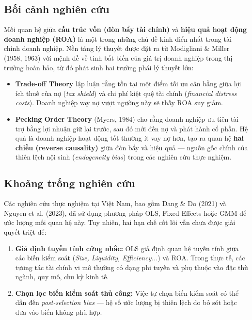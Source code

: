 \documentclass[12pt,a4paper]{article}
\begin{document}
\subsection{Bối cảnh nghiên cứu}
Mối quan hệ giữa \textbf{cấu trúc vốn (đòn bẩy tài chính)} và \textbf{hiệu quả hoạt động doanh nghiệp (ROA)} là một trong những chủ đề kinh điển nhất trong tài chính doanh nghiệp. Nền tảng lý thuyết được đặt ra từ Modigliani \& Miller (1958, 1963) với mệnh đề về tính bất biến của giá trị doanh nghiệp trong thị trường hoàn hảo, từ đó phát sinh hai trường phái lý thuyết lớn:
\begin{itemize}
    \item \textbf{Trade-off Theory} lập luận rằng tồn tại một điểm tối ưu cân bằng giữa lợi ích thuế của nợ (\textit{tax shield}) và chi phí kiệt quệ tài chính (\textit{financial distress costs}). Doanh nghiệp vay nợ vượt ngưỡng này sẽ thấy ROA suy giảm.
    \item \textbf{Pecking Order Theory} (Myers, 1984) cho rằng doanh nghiệp ưu tiên tài trợ bằng lợi nhuận giữ lại trước, sau đó mới đến nợ và phát hành cổ phần. Hệ quả là doanh nghiệp hoạt động tốt thường ít vay nợ hơn, tạo ra quan hệ \textbf{hai chiều (reverse causality)} giữa đòn bẩy và hiệu quả --- nguồn gốc chính của thiên lệch nội sinh (\textit{endogeneity bias}) trong các nghiên cứu thực nghiệm.
\end{itemize}

\subsection{Khoảng trống nghiên cứu}
Các nghiên cứu thực nghiệm tại Việt Nam, bao gồm Dang \& Do (2021) và Nguyen et al. (2023), đã sử dụng phương pháp OLS, Fixed Effects hoặc GMM để ước lượng mối quan hệ này. Tuy nhiên, hai hạn chế cốt lõi vẫn chưa được giải quyết triệt để:
\begin{enumerate}
    \item \textbf{Giả định tuyến tính cứng nhắc:} OLS giả định quan hệ tuyến tính giữa các biến kiểm soát (\textit{Size, Liquidity, Efficiency...}) và ROA. Trong thực tế, các tương tác tài chính vi mô thường có dạng phi tuyến và phụ thuộc vào đặc thù ngành, quy mô, chu kỳ kinh tế.
    \item \textbf{Chọn lọc biến kiểm soát thủ công:} Việc tự chọn biến kiểm soát có thể dẫn đến \textit{post-selection bias} --- hệ số ước lượng bị thiên lệch do bỏ sót hoặc đưa vào biến không phù hợp.
\end{enumerate}
\end{document}
